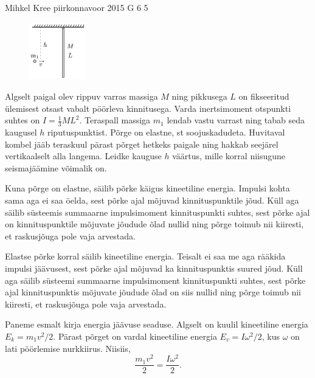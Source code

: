 {Mihkel Kree} %
{piirkonnavoor} %
{2015} %
{G 6} %
{5} %
{
\ifStatement

\begin{figure}
 \begin{center}
 \includegraphics[width=0.22\textwidth]{2015-v2g-06-porgejoonis}
 \end{center}
\end{figure}

Algselt paigal olev rippuv varras massiga $M$ ning pikkusega $L$ on fikseeritud ülemisest otsast vabalt pöörleva kinnitusega. Varda inertsimoment otspunkti suhtes on $I=\frac{1}{3}ML^2$. Teraspall massiga $m_1$ lendab vastu varrast ning tabab seda kaugusel $h$ riputuspunktist. Põrge on elastne, st soojuskadudeta. Huvitaval kombel jääb teraskuul pärast põrget hetkeks paigale ning hakkab seejärel vertikaalselt alla langema. Leidke kauguse $h$ väärtus, mille korral niisugune seismajäämine võimalik on.
\fi


\ifHint
Kuna põrge on elastne, säilib põrke käigus kineetiline energia. Impulsi kohta sama aga ei saa öelda, sest põrke ajal mõjuvad kinnituspunktile jõud. Küll aga säilib süsteemis summaarne impulsimoment kinnituspunkti suhtes, sest põrke ajal on kinnituspunktile mõjuvate jõudude õlad nullid ning põrge toimub nii kiiresti, et raskusjõuga pole vaja arvestada.
\fi


\ifSolution
Elastse põrke korral säilib kineetiline energia. Teisalt ei saa me aga rääkida impulsi jäävusest, sest põrke ajal mõjuvad ka kinnituspunktis suured jõud. Küll aga säilib süsteemi summaarne impulsimoment kinnituspunkti suhtes, sest põrke ajal kinnituspunktis mõjuvate jõudude õlad on siis nullid ning põrge toimub nii kiiresti, et raskusjõuga pole vaja arvestada.

Paneme esmalt kirja energia jäävuse seaduse. Algselt on kuulil kineetiline energia $E_k=m_1v^2/2$. Pärast põrget on vardal kineetiline energia $E_v=I\omega^2/2$, kus $\omega$ on lati pöörlemise nurkkiirus. Niisiis,
\[
\frac{m_1v^2}{2}=\frac{I\omega^2}{2}.
\]

}
